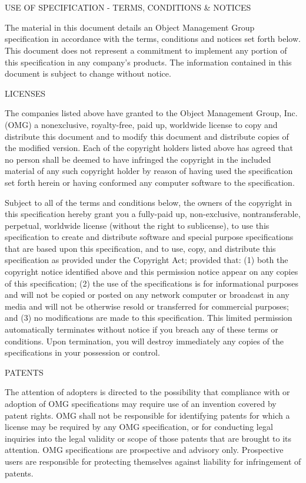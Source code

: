 \documentclass[10pt, a4paper]{isov2}
\newcommand{\ec}[0]{~\\{{\color{violet}\large \hrulefill {\normalfont{end}} \hrulefill\\}  }}
\newcommand{\OMGparagraph}[1]{
\vspace{23pt}
{\centerline {#1}}
\vspace{3pt}
}
\begin{document}
\ec

\OMGparagraph{USE OF SPECIFICATION - TERMS, CONDITIONS \& NOTICES}
The material in this document details an Object Management Group specification in accordance with
 the terms, conditions and notices set forth below. This document does not represent a commitment
  to implement any portion of this specification in any company's products. The information
   contained in this document is subject to change without notice.


\OMGparagraph{LICENSES}
The companies listed above have granted to the Object Management Group, Inc. (OMG) a nonexclusive,
 royalty-free, paid up, worldwide license to copy and distribute this document and to modify this 
  document and distribute copies of the modified version. Each of the copyright holders listed 
   above has agreed that no person shall be deemed to have infringed the copyright in the included 
    material of any such copyright holder by reason of having used the specification set forth 
	 herein or having conformed any computer software to the specification.

Subject to all of the terms and conditions below, the owners of the copyright in this specification 
hereby grant you a fully-paid up, non-exclusive, nontransferable, perpetual, worldwide license 
 (without the right to sublicense), to use this specification to create and distribute software and 
  special purpose specifications that are based upon this specification, and to use, copy, and 
distribute this specification as provided under the Copyright Act; provided that: (1) both the 
 copyright notice identified above and this permission notice appear on any copies of this 
  specification; (2) the use of the specifications is for informational purposes and will not be 
copied or posted on any network computer or broadcast in any media and will not be otherwise resold 
 or transferred for commercial purposes; and (3) no modifications are made to this specification. 
This limited permission automatically terminates without notice if you breach any of these terms or 
 conditions. Upon termination, you will destroy immediately any copies of the specifications in 
  your possession or control.



\OMGparagraph{PATENTS}
The attention of adopters is directed to the possibility that compliance with or adoption of OMG 
 specifications may require use of an invention covered by patent rights. OMG shall not be 
  responsible for identifying patents for which a license may be required by any OMG specification, 
   or for conducting legal inquiries into the legal validity or scope of those patents that are 
    brought to its attention. OMG specifications are prospective and advisory only. Prospective 
	 users are responsible for protecting themselves against liability for infringement of patents.
\end{document}
